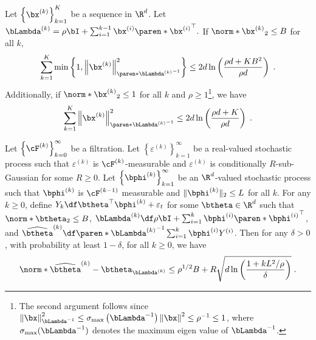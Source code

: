 \begin{lemma}\label{lemma:elliptical potential}
Let \(\left\{\bx^{(k)} \right\}_{k=1}^K\) be a sequence in $\R^d$.
Let \(\bLambda^{(k)}=\rho \bI+\sum_{i=1}^{k-1} \bx^{(i)} \paren*{\bx^{(i)}}^{\top}.
\)
If \(\norm*{\bx^{(k)}}_2 \leq B\) for all $k$, 
$$
\sum_{k=1}^K \min \left\{1,\left\|\bx^{(k)}\right\|_{\paren*{\bLambda^{(k)}}^{-1}}^2\right\} \leq 2 d \ln \left(\frac{\rho d+K B^2}{\rho d}\right)\;.
$$
Additionally, if \(\norm*{\bx^{(k)}}_2 \leq 1\) for all $k$ and $\rho \geq 1$\footnote{The second argument follows since $\left\|\bx\right\|_{\bLambda^{-1}}^2 \leq \sigma_{\max }\left(\bLambda^{-1}\right)\left\|\bx\right\|^2 \leq \rho^{-1} \leq 1$, where $\sigma_{\max}(\bLambda^{-1})$ denotes the maximum eigen value of $\bLambda^{-1}$.}, we have
$$
\sum_{k=1}^K \left\|\bx^{(k)}\right\|_{\paren*{\bLambda^{(k)}}^{-1}}^2 \leq 2 d \ln \left(\frac{\rho d+K}{\rho d}\right)\;.
$$
\end{lemma}

\begin{lemma}\label{lemma:confidence-ellipsoid}
Let $\left\{\cF^{(k)}\right\}_{k=0}^{\infty}$ be a filtration. 
Let $\left\{\varepsilon^{(k)}\right\}_{k=1}^{\infty}$ be a real-valued stochastic process such that $\varepsilon^{(k)}$ is $\cF^{(k)}$-measurable and $\varepsilon^{(k)}$ is conditionally $R$-sub-Gaussian for some $R \geq 0$. 
Let $\left\{\bphi^{(k)}\right\}_{k=1}^{\infty}$ be an $\R^d$-valued stochastic process such that $\bphi^{(k)}$ is $\cF^{(k-1)}$ measurable and $\|\bphi^{(k)}\|_2 \leq L$ for all $k$. 
For any $k \geq 0$, define $Y_k \df \btheta^\top \bphi^{(k)}+ \varepsilon_t$ for some $\btheta \in \R^d$ such that $\norm*{\btheta}_2 \leq B$,
$\bLambda^{(k)}\df\rho \bI+\sum_{i=1}^k \bphi^{(i)} \paren*{\bphi^{(i)}}^\top$,
and  \(\widehat{\btheta}^{(k)} \df \paren*{\bLambda^{(k)}}^{-1}\sum_{i =1}^k \bphi^{(i)} Y^{(i)} \).
Then for any $\delta>0$, with probability at least $1-\delta$, for all $k \geq 0$, we have
\begin{align*}
\norm*{\widehat{\btheta}^{(k)}-\btheta}_{\bLambda^{(k)}} \leq 
\rho^{1 / 2} B + 
R \sqrt{d \ln \left(\frac{1+k L^2 / \rho}{\delta}\right)}\;.
\end{align*}
\end{lemma}


